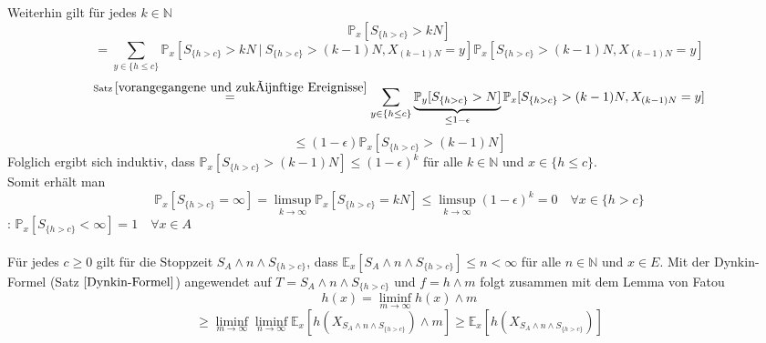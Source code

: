 \begin{itemize}
\begin{equation*}
\end{equation*}
Weiterhin gilt für jedes $k \in \mathbb{N}$
\begin{equation*}
\mathbb{P}_{x}[S_{\lbrace h > c \rbrace}> kN]
\end{equation*}
\begin{equation*}
= \sum_{y \in {\lbrace h \leq c \rbrace}} \mathbb{P}_{x}[S_{\lbrace h > c \rbrace}> kN \: | \: S_{\lbrace h > c \rbrace} > (k-1)N, X_{(k-1)N}=y] \mathbb{P}_{x}[S_{\lbrace h > c \rbrace} > (k-1)N, X_{(k-1)N}=y]
\end{equation*}
\begin{equation*}
\stackrel{\mathrm{Satz} \: \ref{vorangegangene und zukünftige Ereignisse}}{=} \sum_{y \in {\lbrace h \leq c \rbrace}} \underbrace{\mathbb{P}_{y}[S_{\lbrace h > c \rbrace}> N]}_{\leq 1 - \epsilon} \mathbb{P}_{x}[S_{\lbrace h > c \rbrace} > (k-1)N, X_{(k-1)N}=y]
\end{equation*}
\begin{equation*}
\leq (1-\epsilon) \mathbb{P}_{x}[S_{\lbrace h > c \rbrace} > (k-1)N]
\end{equation*}
Folglich ergibt sich induktiv, dass $\mathbb{P}_{x}[S_{\lbrace h > c \rbrace} > (k-1)N] \leq (1-\epsilon)^{k}$ für alle $k \in \mathbb{N}$ und $x \in \lbrace h \leq c \rbrace$.
\\
Somit erhält man 
\begin{equation*}
\mathbb{P}_{x}[S_{\lbrace h > c \rbrace} = \infty] = \limsup_{k \to \infty} \mathbb{P}_{x}[S_{\lbrace h > c \rbrace} = kN] \leq \limsup_{k \to \infty} (1-\epsilon)^{k} = 0 \quad \forall x \in {\lbrace h > c \rbrace}
\end{equation*}
: $\mathbb{P}_{x}[S_{\lbrace h > c \rbrace} < \infty] = 1 \quad \forall x \in A$
\\
\\
Für jedes $c \geq 0$ gilt für die Stoppzeit $S_{A} \wedge n \wedge S_{{\lbrace h > c \rbrace}}$, dass $\mathbb{E}_{x}[S_{A} \wedge n \wedge S_{{\lbrace h > c \rbrace}}] \leq n < \infty$ für alle $n \in \mathbb{N}$ und $x \in E$. Mit der Dynkin-Formel (Satz $\ref{Dynkin-Formel}$) angewendet auf $T=S_{A} \wedge n \wedge S_{{\lbrace h > c \rbrace}}$ und $f = h \wedge m$ folgt zusammen mit dem Lemma von Fatou
\begin{equation*}
h(x) = \liminf_{m \to \infty} h(x) \wedge m
\end{equation*} 
\begin{equation*}
\geq \liminf_{m \to \infty} \liminf_{n \to \infty} \mathbb{E}_{x}[h(X_{S_{A} \wedge n \wedge S_{\lbrace h > c \rbrace}} ) \wedge m] \geq \mathbb{E}_{x}[h(X_{S_{A} \wedge n \wedge S_{\lbrace h > c \rbrace}} )]

\end{equation*}
\end{itemize}
